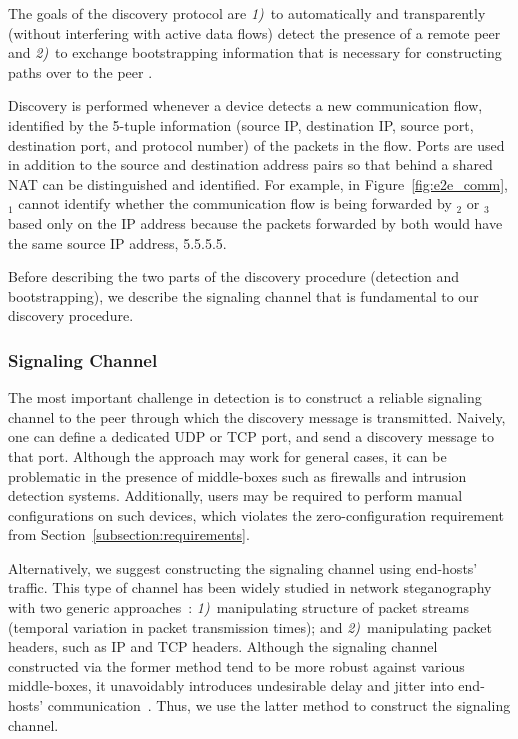 The goals of the \name discovery protocol are \textit{1)}~to automatically and
transparently (\ie without interfering with active data flows) detect the
presence of a remote peer and \textit{2)}~to exchange bootstrapping information
that is necessary for constructing paths over \scion to the peer \name.

Discovery is performed whenever a \name device detects a new communication
flow, identified by the 5-tuple information (source IP, destination IP, source
port, destination port, and protocol number) of the packets in the flow. Ports
are used in addition to the source and destination address pairs so that \names
behind a shared NAT can be distinguished and identified. For example, in
Figure~\ref{fig:e2e_comm}, \namens$_1$ cannot identify whether the
communication flow is being forwarded by \namens$_2$ or \namens$_3$ based only
on the IP address because the packets forwarded by both \names would have the
same source IP address, 5.5.5.5.

Before describing the two parts of the discovery procedure (detection and
bootstrapping), we describe the signaling channel that is fundamental to our
discovery procedure.

\subsubsection{Signaling Channel}
\label{sssec:hidden_signals}

The most important challenge in \name detection is to construct a reliable
signaling channel to the peer \name through which the \name discovery message
is transmitted. Naively, one can define a dedicated UDP or TCP port, and send a
discovery message to that port. Although the approach may work for general
cases, it can be problematic in the presence of middle-boxes such as firewalls
and intrusion detection systems. Additionally, users may be required to perform
manual configurations on such devices, which violates the zero-configuration
requirement from Section~\ref{subsection:requirements}.

Alternatively, we suggest constructing the signaling channel using end-hosts'
traffic. This type of channel has been widely studied in network steganography
with two generic approaches~\cite{Mazurczyk:2013:VSD:2543581.2543587}:
\textit{1)}~manipulating structure of packet streams (\ie temporal variation in
packet transmission times); and \textit{2)}~manipulating packet headers, such
as IP and TCP headers.  Although the signaling channel constructed via the
former method tend to be more robust against various middle-boxes, it
unavoidably introduces undesirable delay and jitter into end-hosts'
communication~\cite{mazurczyk2011}. Thus, we use the latter method to construct
the signaling channel.

